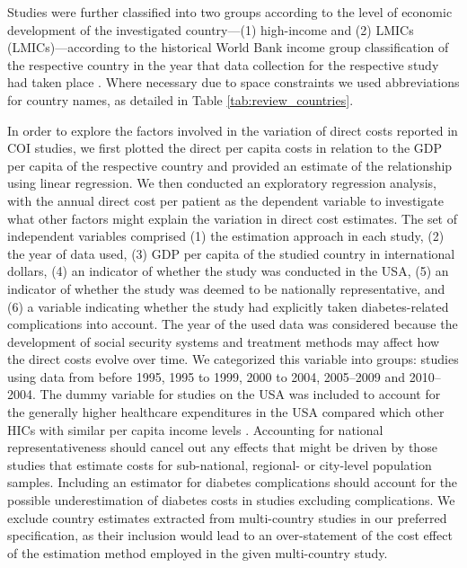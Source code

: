 \documentclass[12pt,english]{article}
\begin{document}
Studies were further classified into two groups according to the level of economic development of the investigated country---(1) high-income and (2) \acp{LMIC} (\acp{LMIC})---according to the historical World Bank income group classification of the respective country in the year that data collection for the respective study had taken place \parencite{WorldBank}. Where necessary due to space constraints we used abbreviations for country names, as detailed in Table \ref{tab:review_countries}.

In order to explore the factors involved in the variation of direct costs reported in \ac{COI} studies, we first plotted the direct per capita costs in relation to the \ac{GDP} per capita of the respective country and provided an estimate of the relationship using linear regression. We then conducted an exploratory regression analysis, with the annual direct cost per patient as the dependent variable to investigate what other factors might explain the variation in direct cost estimates. The set of independent variables comprised (1) the estimation approach in each study, (2) the year of data used, (3) \ac{GDP} per capita of the studied country in international dollars, (4) an indicator of whether the study was conducted in the USA, (5) an indicator of whether the study was deemed to be nationally representative, and (6) a variable indicating whether the study had explicitly taken diabetes-related complications into account. The year of the used data was considered because the development of social security systems and treatment methods may affect how the direct costs evolve over time. We categorized this variable into groups: studies using data from before 1995, 1995 to 1999, 2000 to 2004, 2005--2009 and 2010--2004.  The dummy variable for studies on the USA was included to account for the generally higher healthcare expenditures in the USA compared which other \acp{HIC} with similar per capita income levels \parencite{Laugesen2011}. Accounting for national representativeness should cancel out any effects that might be driven by those studies that estimate costs for sub-national, regional- or city-level population samples. Including an estimator for diabetes complications should account for the possible underestimation of diabetes costs in studies excluding complications. We exclude country estimates extracted from multi-country studies in our preferred specification, as their inclusion would lead to an over-statement of the cost effect of the estimation method employed in the given multi-country study. 
\end{document}
